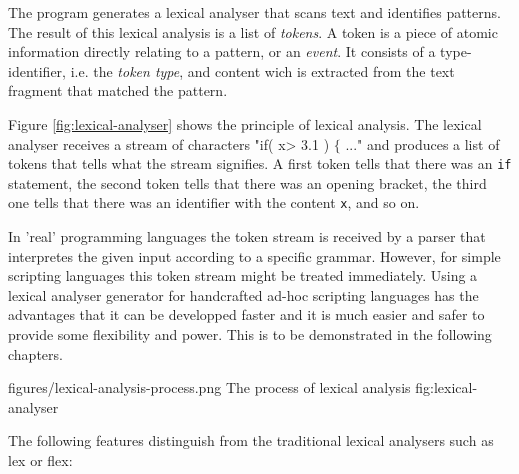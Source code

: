 The {\quex} program generates a lexical analyser that scans text and
identifies patterns. The result of this lexical analysis is a list of {\it
  tokens}. A token is a piece of atomic information directly relating to a
pattern, or an {\it event}. It consists of a type-identifier, i.e. the {\it
  token type}, and content wich is extracted from the text fragment that
matched the pattern. 

Figure \ref{fig:lexical-analyser} shows the principle of lexical
analysis.  The lexical analyser receives a stream of characters "if( x> 3.1 )
$\{$ ..." and produces a list of tokens that tells what the stream signifies. A first
  token tells that there was an {\tt if} statement, the second token tells
  that there was an opening bracket, the third one tells that there was an
  identifier with the content {\tt x}, and so on. 
  
  In 'real' programming languages the token stream is received by a parser
  that interpretes the given input according to a specific grammar. However,
  for simple scripting languages this token stream might be treated
  immediately. Using a lexical analyser generator for handcrafted ad-hoc
  scripting languages has the advantages that it can be developped faster and
  it is much easier and safer to provide some flexibility and power. This is
  to be demonstrated in the following chapters.

\showpic
{figures/lexical-analysis-process.png}
{The process of lexical analysis}
{fig:lexical-analyser}

The following features distinguish {\quex} from the traditional lexical
analysers such as lex or flex:

